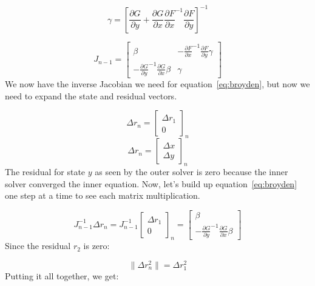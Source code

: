 \documentclass{article}
\begin{document}
\begin{equation}
  \gamma = \left[ \frac{\partial G}{\partial y} + \frac{\partial G}{\partial x} {\frac{\partial F}{\partial x}}^{-1} \frac{\partial F}{\partial y} \right]^{-1}
\end{equation}

\begin{equation}
  J_{n-1} =
  \begin{bmatrix}
    \beta &
    - {\frac{\partial F}{\partial x}}^{-1} \frac{\partial F}{\partial y} \gamma \\
    - {\frac{\partial G}{\partial y}}^{-1} \frac{\partial G}{\partial x} \beta &
    \gamma
  \end{bmatrix}
\end{equation}
We now have the inverse Jacobian we need for equation~\eqref{eq:broyden}, but now we need to expand the state and residual vectors.

\begin{equation}
  \Delta r_n = {
  \begin{bmatrix}
    \Delta r_1 \\
    0
  \end{bmatrix}
  }_n
\end{equation}
\begin{equation}
  \Delta r_n = {
  \begin{bmatrix}
    \Delta x \\
    \Delta y
  \end{bmatrix}
  }_n
\end{equation}
The residual for state $y$ as seen by the outer solver is zero because the inner solver converged the inner equation. Now, let's build up
equation~\eqref{eq:broyden} one step at a time to see each matrix multiplication.

\begin{equation}
  J_{n-1}^{-1} \Delta r_n = J_{n-1}^{-1} {
  \begin{bmatrix}
    \Delta r_1 \\
    0
  \end{bmatrix}
  }_n =
  \begin{bmatrix}
    \beta \\
    - {\frac{\partial G}{\partial y}}^{-1} \frac{\partial G}{\partial x} \beta
  \end{bmatrix}
\end{equation}
Since the residual $r_2$ is zero:

\begin{equation}
  \| \Delta r_{n}^2 \| = \Delta r_{1}^2
\end{equation}
Putting it all together, we get:
\end{document}
